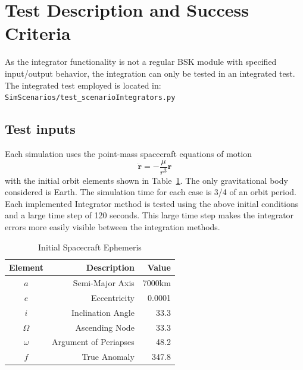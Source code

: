 \section{Test Description and Success Criteria}

As the integrator functionality is not a regular BSK module with specified input/output behavior, the integration can only be tested in an integrated test.  
The integrated test employed is located in:\\

{\tt SimScenarios/test\_scenarioIntegrators.py}
\\

\subsection{Test inputs}
Each simulation uses the point-mass spacecraft equations of motion
\begin{equation}
	\ddot{\bm r} = - \frac{\mu}{r^{3}}{\bm r}
\end{equation}
with the initial orbit elements shown in Table~\ref{tbl:oeInitial}.  The only gravitational body considered is Earth.  The simulation time for each case is 3/4 of an orbit period.  Each implemented Integrator method is tested using the above initial conditions and a large time step of 120 seconds.  This large time step makes the integrator errors more easily visible between the integration methods.  


\begin{table}[htbp]
	\caption{Initial Spacecraft Ephemeris}
	\label{tbl:oeInitial}
	\centering \fontsize{10}{10}\selectfont
	\begin{tabular}{c | r | r } %
		\hline 
		\hline 
		Element    & Description & Value \\
		\hline 
		$a$      & Semi-Major Axis & 7000km \\
		$e$ & Eccentricity     &  0.0001 \\
		$i$       & Inclination Angle  & 33.3\dg \\
		$\Omega$       & Ascending Node   & 33.3\dg \\
		$\omega$       & Argument of Periapses  & 48.2\dg \\
		$f$       & True Anomaly   & 347.8\dg \\
		\hline
		\hline
	\end{tabular}
\end{table}




